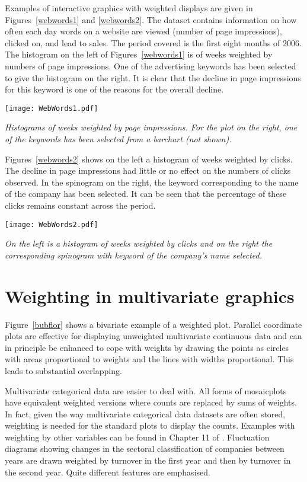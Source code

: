 \documentclass{svmult}
\begin{document}
Examples of interactive graphics with weighted displays are given in Figures~\ref{webwords1} and \ref{webwords2}.  The dataset contains information on how often each day words on a website are viewed (number of page impressions), clicked on, and lead to sales.  The period covered is the first eight months of 2006.  The histogram on the left of Figures~\ref{webwords1} is of weeks weighted by numbers of page impressions.  One of the advertising keywords has been selected to give the histogram on the right.  It is clear that the decline in page impressions for this keyword is one of the reasons for the overall decline.

\begin{center}
      \texttt{[image: WebWords1.pdf]}
      \caption{\label{webwords1}\em Histograms of weeks weighted by page impressions.  For the plot on the right, one of the keywords has been selected from a barchart (not shown).}
      \end{center}

Figures~\ref{webwords2} shows on the left a histogram of weeks weighted by clicks.  The decline in page impressions had little or no effect on the numbers of clicks observed.  In the spinogram on the right, the keyword corresponding to the name of the company has been selected.  It can be seen that the percentage of these clicks remains constant across the period.

\begin{center}
      \texttt{[image: WebWords2.pdf]}
      \caption{\label{webwords2}\em On the left is a histogram of weeks weighted by clicks and on the right the corresponding spinogram with keyword of the company's name selected.}
      \end{center}


\section{Weighting in multivariate graphics}
\label{mv}
Figure~\ref{bubflor} shows a bivariate example of a weighted plot.  Parallel coordinate plots are effective for displaying unweighted multivariate continuous data and can in principle be enhanced to cope with weights by drawing the points as circles with areas proportional to weights and the lines with widths proportional.  This leads to substantial overlapping.

Multivariate categorical data are easier to deal with.  All forms of mosaicplots have equivalent weighted versions where counts are replaced by sums of weights.  In fact, given the way multivariate categorical data datasets are often stored, weighting is needed for the standard plots to display the counts.  Examples with weighting by other variables can be found in Chapter 11 of \cite{unwin:2006}.  Fluctuation diagrams showing changes in the sectoral classification of companies between years are drawn weighted by turnover in the first year and then by turnover in the second year.  Quite different features are emphasised.
\end{document}
